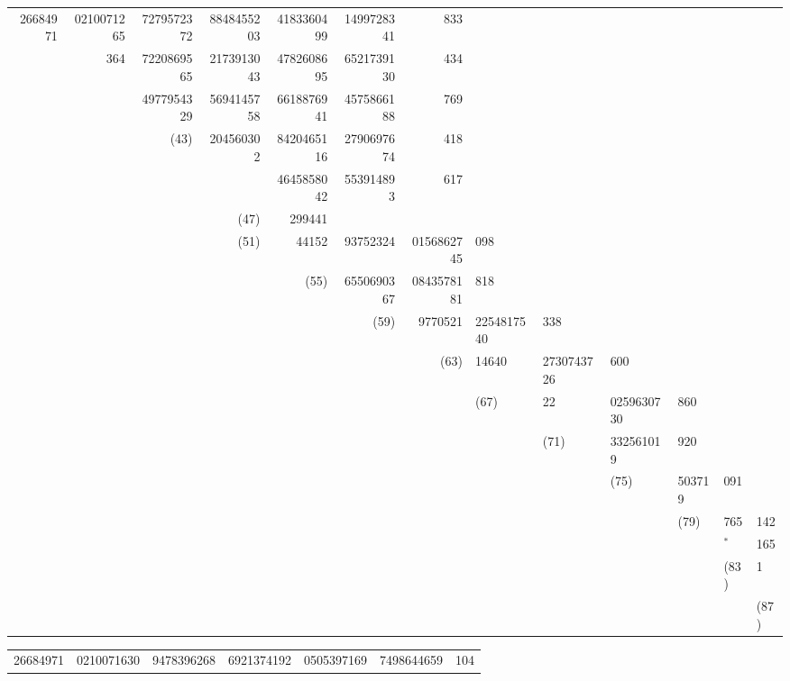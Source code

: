 \documentclass[10pt,a4paper]{article}
\begin{document}
\begin{center}
\begin{tabular}{r r r r r r r}
26684971 & 0210071265 & 7279572372 & 8848455203 & 4183360499 & 1499728341 & 833 \\
& 364 & 7220869565 & 2173913043 & 4782608695 & 6521739130 & 434 \\
& & 4977954329 & 5694145758 & 6618876941 & 4575866188 & 769 \\
& & (43) & 204560302 & 8420465116 & 2790697674 & 418 \\
& & & & 4645858042 & 553914893 & 617 \\
& & & (47) & 299441 & & \\
& & & (51) & 44152 & 93752324 & 0156862745 & 098 \\
& & & & (55) & 6550690367 & 0843578181 & 818 \\
& & & & & (59) & 9770521 & 2254817540 & 338 \\
& & & & & & (63) & 14640 & 2730743726 & 600 \\
& & & & & & & (67) & 22 & 0259630730 & 860 \\
& & & & & & & & (71) & 332561019 & 920 \\
& & & & & & & & & (75) & 503719 & 091 \\
& & & & & & & & & & (79) & 765 & 142 \\
& & & & & & & & & & & $^*$ & 165 \\
& & & & & & & & & & & (83) & 1 \\
& & & & & & & & & & & & (87) \\
\end{tabular}
\end{center}

\medskip

\begin{center}
\begin{tabular}{r r r r r r r}
26684971 & 0210071630 & 9478396268 & 6921374192 & 0505397169 & 7498644659 & 104 \\
\end{tabular}
\end{center}

\medskip
\end{document}
